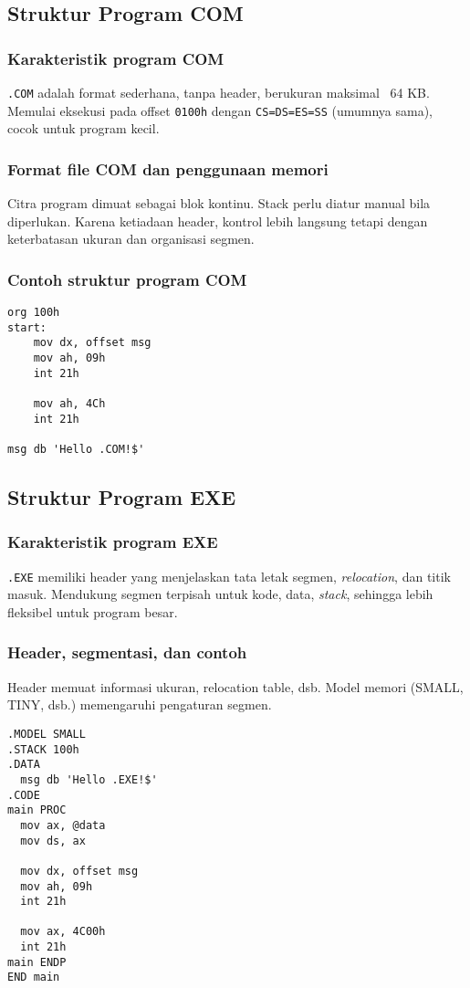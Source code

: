 \documentclass[../main.tex]{subfiles}
\begin{document}
\subsection{Struktur Program COM}
\subsubsection{Karakteristik program COM}
\texttt{.COM} adalah format sederhana, tanpa header, berukuran maksimal ~64 KB. Memulai eksekusi pada offset \texttt{0100h} dengan \texttt{CS=DS=ES=SS} (umumnya sama), cocok untuk program kecil.

\subsubsection{Format file COM dan penggunaan memori}
Citra program dimuat sebagai blok kontinu. Stack perlu diatur manual bila diperlukan. Karena ketiadaan header, kontrol lebih langsung tetapi dengan keterbatasan ukuran dan organisasi segmen.

\subsubsection{Contoh struktur program COM}
\begin{verbatim}
org 100h
start:
    mov dx, offset msg
    mov ah, 09h
    int 21h

    mov ah, 4Ch
    int 21h

msg db 'Hello .COM!$'
\end{verbatim}

\subsection{Struktur Program EXE}
\subsubsection{Karakteristik program EXE}
\texttt{.EXE} memiliki header yang menjelaskan tata letak segmen, \textit{relocation}, dan titik masuk. Mendukung segmen terpisah untuk kode, data, \textit{stack}, sehingga lebih fleksibel untuk program besar.

\subsubsection{Header, segmentasi, dan contoh}
Header memuat informasi ukuran, relocation table, dsb. Model memori (SMALL, TINY, dsb.) memengaruhi pengaturan segmen.
\begin{verbatim}
.MODEL SMALL
.STACK 100h
.DATA
  msg db 'Hello .EXE!$'
.CODE
main PROC
  mov ax, @data
  mov ds, ax

  mov dx, offset msg
  mov ah, 09h
  int 21h

  mov ax, 4C00h
  int 21h
main ENDP
END main
\end{verbatim}
\end{document}

